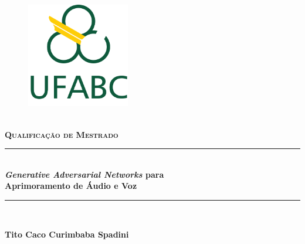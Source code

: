 \begin{titlepage}
		\newcommand{\HRule}{\rule{\linewidth}{0.5mm}}

		\center

		\begin{figure}
			\centering
			\includegraphics[width=0.4\textwidth]{figs/logo_ufabc.png}
		\end{figure}

		\\[0.5cm]
		\textsc{\textbf{\Large Qualificação de Mestrado}}\\[0.5cm] %


		\vspace{1.0cm}

		\HRule \\[0.4cm]
		{ \huge \bfseries \textit{Generative Adversarial Networks} para \\[0.5cm] Aprimoramento de Áudio e Voz}\\[0.25cm] %
		\HRule \\[1.0cm]

		\vspace{0.5cm}


		\vspace{1.0cm}

		\textbf{\LARGE Tito Caco Curimbaba Spadini}\\[1.0cm]


\end{titlepage}

